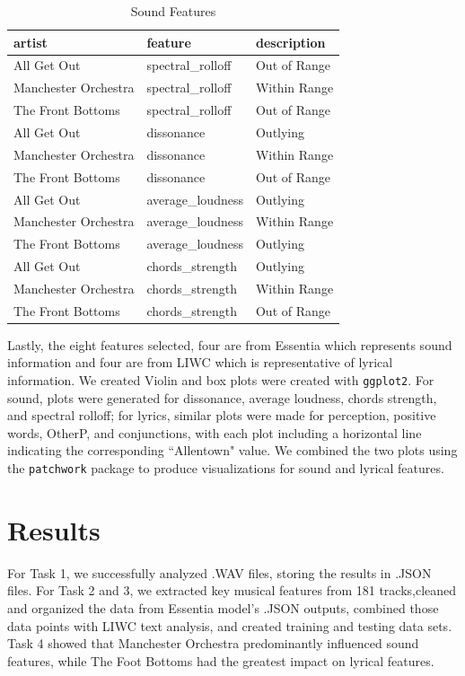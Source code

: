 \documentclass{article}\usepackage[]{graphicx}\usepackage[]{xcolor}
\begin{document}
\begin{multicols}{2}
\begin{table}[H]
\centering
\begingroup\small
\begin{tabular}{lll}
  \hline
artist & feature & description \\ 
  \hline
All Get Out & spectral\_rolloff & Out of Range \\ 
  Manchester Orchestra & spectral\_rolloff & Within Range \\ 
  The Front Bottoms & spectral\_rolloff & Out of Range \\ 
  All Get Out & dissonance & Outlying \\ 
  Manchester Orchestra & dissonance & Within Range \\ 
  The Front Bottoms & dissonance & Out of Range \\ 
  All Get Out & average\_loudness & Outlying \\ 
  Manchester Orchestra & average\_loudness & Within Range \\ 
  The Front Bottoms & average\_loudness & Outlying \\ 
  All Get Out & chords\_strength & Outlying \\ 
  Manchester Orchestra & chords\_strength & Within Range \\ 
  The Front Bottoms & chords\_strength & Out of Range \\ 
   \hline
\end{tabular}
\endgroup
\caption{Sound Features} 
\end{table}

Lastly, the eight features selected, four are from Essentia which represents sound information and four are from LIWC which is representative of lyrical information. We created Violin and box plots were created with \texttt{ggplot2}\citep{Ggplot2}. For sound, plots were generated for dissonance, average loudness, chords strength, and spectral rolloff; for lyrics, similar plots were made for perception, positive words, OtherP, and conjunctions, with each plot including a horizontal line indicating the corresponding ``Allentown" value. We combined the two plots using the \texttt{patchwork} package\citep{Patchwork} to produce visualizations for sound and lyrical features.

\section{Results}
For Task 1, we successfully analyzed .WAV files, storing the results in .JSON files. For Task 2 and 3, we extracted key musical features from 181 tracks,cleaned and organized the data from Essentia model's .JSON outputs, combined those data points with LIWC text analysis, and created training and testing data sets\citep{Bogdanov}. 
Task 4 showed that Manchester Orchestra predominantly influenced sound features, while The Foot Bottoms had the greatest impact on lyrical features. 


\end{multicols}
\end{document}
